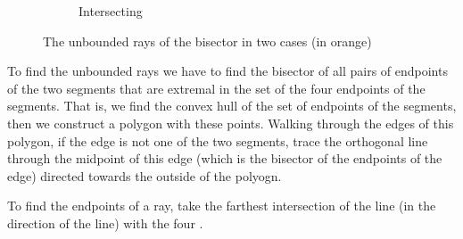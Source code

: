 \documentclass[11pt,a4paper,english]{article}
\begin{document}
\begin{figure}[h]
\begin{subfigure}[b]{0.3\textwidth}
    	\caption{Intersecting \label{fig:four_unbounded_rays}}
	\end{subfigure}
	\caption{The unbounded rays of the bisector in two cases (in orange)\label{fig:unbounded_rays}}
	\end{figure}
	
	To find the unbounded rays we have to find the bisector of all pairs of endpoints of the two segments that are extremal in the set of the four endpoints of the segments. That is, we find the convex hull of the set of endpoints of the segments, then we construct a polygon with these points. Walking through the edges of this polygon, if the edge is not one of the two segments, trace the orthogonal line through the midpoint of this edge (which is the bisector of the endpoints of the edge) directed towards the outside of the polyogn.\par
	To find the endpoints of a ray, take the farthest intersection of the line (in the direction of the line) with the four .
	
\end{document}

